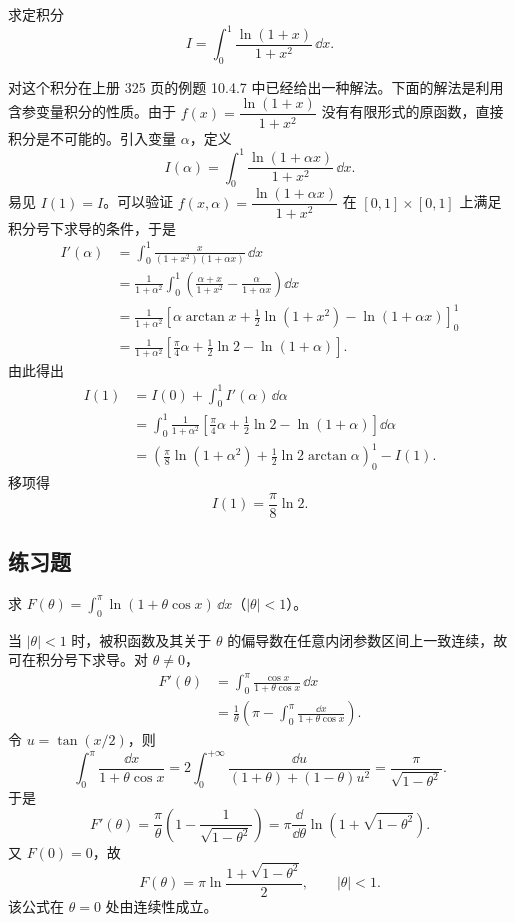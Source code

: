 \begin{xexample}[23.1.6]
求定积分
\[
  I=\int_0^1\frac{\ln(1+x)}{1+x^2}\,\dd x.
\]
\end{xexample}
\begin{xsolution}
对这个积分在上册 325 页的例题 10.4.7 中已经给出一种解法。下面的解法是利用含参变量积分的性质。由于 $f(x)=\dfrac{\ln(1+x)}{1+x^2}$ 没有有限形式的原函数，直接积分是不可能的。引入变量 $\alpha$，定义
\[
  I(\alpha)=\int_0^1\frac{\ln(1+\alpha x)}{1+x^2}\,\dd x.
\]
易见 $I(1)=I$。可以验证 $f(x,\alpha)=\dfrac{\ln(1+\alpha x)}{1+x^2}$ 在 $[0,1]\times[0,1]$ 上满足积分号下求导的条件，于是
\[
\begin{aligned}
  I'(\alpha)&=\int_0^1\frac{x}{(1+x^2)(1+\alpha x)}\,\dd x\\
  &=\frac{1}{1+\alpha^2}\int_0^1\left(\frac{\alpha+x}{1+x^2}-\frac{\alpha}{1+\alpha x}\right)\dd x\\
  &=\frac{1}{1+\alpha^2}\left[\alpha\arctan x+\frac12\ln(1+x^2)-\ln(1+\alpha x)\right]_0^1\\
  &=\frac{1}{1+\alpha^2}\left[\frac\pi4\alpha+\frac12\ln2-\ln(1+\alpha)\right].
\end{aligned}
\]
由此得出
\[
\begin{aligned}
  I(1)&=I(0)+\int_0^1 I'(\alpha)\,\dd\alpha\\
  &=\int_0^1\frac{1}{1+\alpha^2}\left[\frac\pi4\alpha+\frac12\ln2-\ln(1+\alpha)\right]\dd\alpha\\
  &=\left(\frac\pi8\ln(1+\alpha^2)+\frac12\ln2\arctan\alpha\right)_0^1-I(1).
\end{aligned}
\]
移项得
\[
  I(1)=\frac\pi8\ln2.
\]
\end{xsolution}

\subsection{练习题}
\begin{xexercise}[1]
求 $F(\theta)=\displaystyle\int_0^\pi\ln(1+\theta\cos x)\,\dd x$（$|\theta|<1$）。
\end{xexercise}
\begin{xsolution}
当 $|\theta|<1$ 时，被积函数及其关于 $\theta$ 的偏导数在任意内闭参数区间上一致连续，故可在积分号下求导。对 $\theta\neq0$，
\[
\begin{aligned}
F'(\theta)
&=\int_0^\pi\frac{\cos x}{1+\theta\cos x}\,\dd x\\
&=\frac1\theta\left(\pi-\int_0^\pi\frac{\dd x}{1+\theta\cos x}\right).
\end{aligned}
\]
令 $u=\tan(x/2)$，则
\[
\int_0^\pi\frac{\dd x}{1+\theta\cos x}
=2\int_0^{+\infty}\frac{\dd u}{(1+\theta)+(1-\theta)u^2}
=\frac\pi{\sqrt{1-\theta^2}}.
\]
于是
\[
F'(\theta)=\frac\pi\theta\left(1-\frac1{\sqrt{1-\theta^2}}\right)
=\pi\frac{\dd}{\dd\theta}\ln\left(1+\sqrt{1-\theta^2}\right).
\]
又 $F(0)=0$，故
\[
\boxed{F(\theta)=\pi\ln\frac{1+\sqrt{1-\theta^2}}2},
\qquad |\theta|<1.
\]
该公式在 $\theta=0$ 处由连续性成立。
\end{xsolution}


